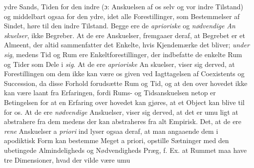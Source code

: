 \documentclass[12pt,a4paper]{book}
\begin{document}
ydre Sands, Tiden for den indre (ɔ: Anskuelsen af os selv og
vor indre Tilstand) og middelbart ogsaa for den ydre, idet alle
Forestillinger, som Bestemmelser af Sindet, høre til den indre
Tilstand. Begge ere de \emph{aprioriske} og \emph{nødvendige An\-%
skuelser}, ikke Begreber. At de ere Anskuelser, fremgaaer
deraf, at Begrebet er et Almeent, der altid sammenfatter det
Enkelte, hvis Kjendemærke det bliver; \emph{under sig}, medens
Tid og Rum ere Enkeltforestillinger, der indbefatte de enkelte
Rum og Tider som Dele i \emph{sig}. At de ere \emph{aprioriske} An\-%
skuelser, viser sig derved, at Forestillingen om dem ikke kan
være os given ved Iagttagelsen af Coexistents og Succession,
da disse Forhold forudsætte Rum og Tid, og at den over\-%
hovedet ikke kan være laant fra Erfaringen, fordi Rums- og
Tidsanskuelsen netop er Betingelsen for at en Erfaring over\-%
hovedet kan gjøres, at et Object kan blive til for os. At de
ere \emph{nødvendige} Anskuelser, viser sig derved, at det er umu\-%
ligt at abstrahere fra dem medens der kan abstraheres fra
alt Empirisk. Det, at de ere \emph{rene} Anskuelser a \emph{priori} ind\-%
lyser ogsaa deraf, at man angaaende dem i apodiktisk Form
kan bestemme Meget a priori, opstille Sætninger med den
ubetingede Almindeligheds og Nødvendigheds Præg, f. Ex. at
Rummet maa have tre Dimensioner, hvad der vilde være umu\-%
\end{document}
